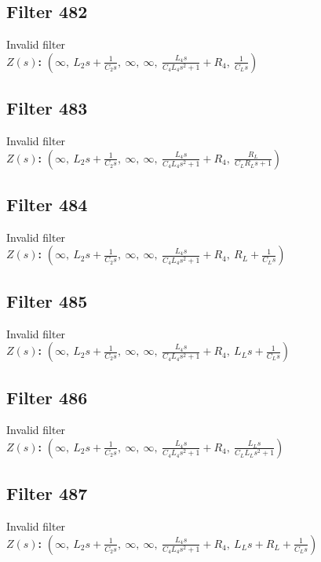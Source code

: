 \documentclass{article}
\begin{document}
\subsection*{Filter 482}
Invalid filter \\ 
\textbf{$Z(s)$:} $\left( \infty, \  L_{2} s + \frac{1}{C_{2} s}, \  \infty, \  \infty, \  \frac{L_{4} s}{C_{4} L_{4} s^{2} + 1} + R_{4}, \  \frac{1}{C_{L} s}\right)$ \\ 
\subsection*{Filter 483}
Invalid filter \\ 
\textbf{$Z(s)$:} $\left( \infty, \  L_{2} s + \frac{1}{C_{2} s}, \  \infty, \  \infty, \  \frac{L_{4} s}{C_{4} L_{4} s^{2} + 1} + R_{4}, \  \frac{R_{L}}{C_{L} R_{L} s + 1}\right)$ \\ 
\subsection*{Filter 484}
Invalid filter \\ 
\textbf{$Z(s)$:} $\left( \infty, \  L_{2} s + \frac{1}{C_{2} s}, \  \infty, \  \infty, \  \frac{L_{4} s}{C_{4} L_{4} s^{2} + 1} + R_{4}, \  R_{L} + \frac{1}{C_{L} s}\right)$ \\ 
\subsection*{Filter 485}
Invalid filter \\ 
\textbf{$Z(s)$:} $\left( \infty, \  L_{2} s + \frac{1}{C_{2} s}, \  \infty, \  \infty, \  \frac{L_{4} s}{C_{4} L_{4} s^{2} + 1} + R_{4}, \  L_{L} s + \frac{1}{C_{L} s}\right)$ \\ 
\subsection*{Filter 486}
Invalid filter \\ 
\textbf{$Z(s)$:} $\left( \infty, \  L_{2} s + \frac{1}{C_{2} s}, \  \infty, \  \infty, \  \frac{L_{4} s}{C_{4} L_{4} s^{2} + 1} + R_{4}, \  \frac{L_{L} s}{C_{L} L_{L} s^{2} + 1}\right)$ \\ 
\subsection*{Filter 487}
Invalid filter \\ 
\textbf{$Z(s)$:} $\left( \infty, \  L_{2} s + \frac{1}{C_{2} s}, \  \infty, \  \infty, \  \frac{L_{4} s}{C_{4} L_{4} s^{2} + 1} + R_{4}, \  L_{L} s + R_{L} + \frac{1}{C_{L} s}\right)$ \\ 
\end{document}

